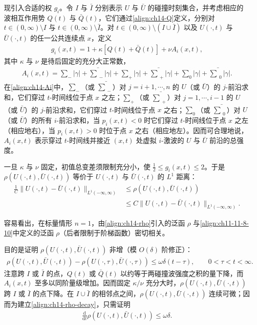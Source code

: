 \documentclass[../../main.tex]{subfiles}
\begin{document}
现引入合适的权 $g_i$。令 $I$ 与 $\bar I$ 分别表示 $U$ 与 $\bar U$ 的碰撞时刻集合，并考虑相应的波相互作用势 $Q(t)$ 与 $\bar Q(t)$，它们通过\eqref{align:ch14-Q}定义，分别对 $t\in(0,\infty)\setminus I$ 与 $t\in(0,\infty)\setminus\bar I$。对 $t\in(0,\infty)\setminus(I\cup\bar I)$ 以及 $U(\cdot,t)$ 与 $\bar U(\cdot,t)$ 的任一公共连续点 $x$，定义
\begin{align}
g_i(x,t)=1+\kappa[Q(t)+\bar Q(t)]+\nu A_i(x,t),
\label{align:ch14-gi}
\end{align}
其中 $\kappa$ 与 $\nu$ 是待后固定的充分大正常数，
\begin{align}
A_i(x,t)=\sum_-|\gamma|+\bar\sum_-|\gamma|+\sum_+|\gamma|+\bar\sum_+|\gamma|+\sum_0|\gamma|+\bar\sum_0|\gamma|.
\label{align:ch14-Ai}
\end{align}
在\eqref{align:ch14-Ai}中，$\sum_-$（或 $\bar\sum_-$）对 $j=i+1,\cdots,n$ 的 $U$（或 $\bar U$）的 $j$-前沿求和，它们穿过 $t$-时间线位于点 $x$ 之左；$\sum_+$（或 $\bar\sum_+$）对 $j=1,\cdots,i-1$ 的 $U$（或 $\bar U$）的 $j$-前沿求和，它们穿过 $t$-时间线位于点 $x$ 之右；$\sum_0$（或 $\bar\sum_0$）对 $U$（或 $\bar U$）的所有 $i$-前沿求和，当 $p_i(x,t)<0$ 时它们穿过 $t$-时间线位于点 $x$ 之左（相应地右），当 $p_i(x,t)>0$ 时位于点 $x$ 之右（相应地左）。因而可合理地说，$A_i(x,t)$ 表示穿过 $t$-时间线并接近 $(x,t)$ 处虚拟 $i$-激波的 $U$ 与 $\bar U$ 前沿的总强度。

一旦 $\kappa$ 与 $\nu$ 固定，初值总变差须限制充分小，使 $\frac12\leqslant g_i(x,t)\leqslant2$。于是 $\rho(U(\cdot,t),\bar U(\cdot,t))$ 等价于 $U(\cdot,t)$ 与 $\bar U(\cdot,t)$ 的 $L^1$ 距离：
\begin{align}
\frac1C\|U(\cdot,t)-\bar U(\cdot,t)\|_{L^1(-\infty,\infty)}&\leqslant\rho(U(\cdot,t),\bar U(\cdot,t))\nonumber\\
&\leqslant C\|U(\cdot,t)-\bar U(\cdot,t)\|_{L^1(-\infty,\infty)}.
\label{align:ch14-rho-equiv}
\end{align}

容易看出，在标量情形 $n=1$，由\eqref{align:ch14-rho}引入的泛函 $\rho$ 与\eqref{align:ch11-11-8-10}中定义的泛函 $\rho$（后者限制于阶梯函数）密切相关。



目的是证明 $\rho(U(\cdot,t),\bar U(\cdot,t))$ 非增（模 $O(\delta)$ 阶修正）：
\begin{align}
\rho(U(\cdot,t),\bar U(\cdot,t))-\rho(U(\cdot,\tau),\bar U(\cdot,\tau))\leqslant\omega\delta(t-\tau),\qquad 0<\tau<t<\infty.
\label{align:ch14-rho-decay}
\end{align}
注意跨 $I$ 或 $\bar I$ 的点，$Q(t)$ 或 $\bar Q(t)$ 以约等于两碰撞波强度之积的量下降，而 $A_i(x,t)$ 至多以同阶量级增加。因而固定 $\kappa/\nu$ 充分大时，$\rho(U(\cdot,t),\bar U(\cdot,t))$ 跨 $I$ 或 $\bar I$ 的点下降。在 $I\cup\bar I$ 的相邻点之间，$\rho(U(\cdot,t),\bar U(\cdot,t))$ 连续可微；因而为建立\eqref{align:ch14-rho-decay}，只需证明
\begin{align}
\frac{\mathrm{d}}{\mathrm{d}t}\rho(U(\cdot,t),\bar U(\cdot,t))\leqslant\omega\delta.
\label{align:ch14-rho-deriv}
\end{align}
\end{document}
